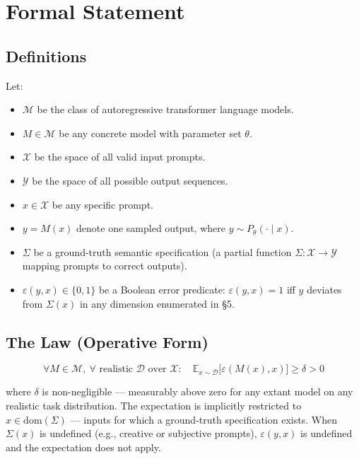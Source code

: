 \documentclass[11pt,a4paper]{article}
\begin{document}
\section{Formal Statement}

\subsection{Definitions}

Let:
\begin{itemize}[nosep]
  \item $\mathcal{M}$ be the class of autoregressive transformer language models.
  \item $M \in \mathcal{M}$ be any concrete model with parameter set $\theta$.
  \item $\mathcal{X}$ be the space of all valid input prompts.
  \item $\mathcal{Y}$ be the space of all possible output sequences.
  \item $x \in \mathcal{X}$ be any specific prompt.
  \item $y = M(x)$ denote one sampled output, where $y \sim P_\theta(\cdot \mid x)$.
  \item $\Sigma$ be a ground-truth semantic specification (a partial function $\Sigma : \mathcal{X} \to \mathcal{Y}$ mapping prompts to correct outputs).
  \item $\varepsilon(y, x) \in \{0, 1\}$ be a Boolean error predicate: $\varepsilon(y, x) = 1$ iff $y$ deviates from $\Sigma(x)$ in any dimension enumerated in \S5.
\end{itemize}

\subsection{The Law (Operative Form)}

\begin{equation}
\forall M \in \mathcal{M},\ \forall \text{ realistic } \mathcal{D} \text{ over } \mathcal{X}:
\quad \mathbb{E}_{x \sim \mathcal{D}}\!\bigl[\varepsilon(M(x), x)\bigr] \geq \delta > 0
\end{equation}

where $\delta$ is non-negligible --- measurably above zero for any extant model on any realistic task distribution. The expectation is implicitly restricted to $x \in \text{dom}(\Sigma)$ --- inputs for which a ground-truth specification exists. When $\Sigma(x)$ is undefined (e.g., creative or subjective prompts), $\varepsilon(y,x)$ is undefined and the expectation does not apply.
\end{document}
